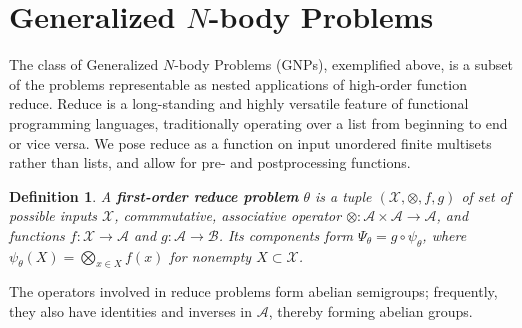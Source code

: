 \documentclass{article}
\newtheorem{definition} {Definition}
\newcommand{\killspace}{\vspace{-0.08in}}
\newcommand{\mysection}[1]{\vspace{-0.04in}\section{#1}\killspace}
\newcommand{\comp}{\mathbin{\circ}}
\begin{document}
%  
%  
%  
%  

\mysection{Generalized $N$-body Problems}

The class of Generalized $N$-body Problems (GNPs), exemplified above,
is a subset of the problems representable as nested applications of high-order function
reduce.  Reduce is a long-standing and highly versatile feature of
functional programming languages, traditionally operating over a list
from beginning to end or vice versa.  We pose reduce as a function on
input unordered finite multisets
rather than lists, and
allow for pre- and postprocessing functions.
\begin{definition}
  A {\bf first-order reduce problem} $\theta$ is a tuple
  $(\mathcal{X},\otimes,f,g)$ of set of possible inputs $\mathcal{X}$,
  commmutative, associative operator $\otimes \colon \mathcal{A}
  \times \mathcal{A} \to \mathcal{A}$, and functions $f \colon
  \mathcal{X} \to \mathcal{A}$ and $g \colon \mathcal{A} \to
  \mathcal{B}$.  Its components form $\Psi_{\theta} = g \comp
  \psi_{\theta}$, where $\psi_{\theta}(X) = \bigotimes_{x \in X} f(x)$
  for nonempty $X \subset \mathcal{X}$.
\end{definition}
\killspace
\noindent The operators involved in reduce problems form abelian
semigroups; frequently, they also have identities and inverses in
$\mathcal{A}$, thereby forming abelian groups.
\end{document}
